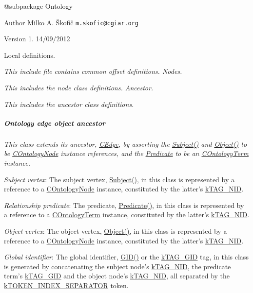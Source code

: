 {\itshape \begin{DoxyVerb} @subpackage        Ontology
\end{DoxyVerb}
}

{\itshape \begin{DoxyAuthor}{Author}
Milko A. Škofič \href{mailto:m.skofic@cgiar.org}{\tt m.\-skofic@cgiar.\-org} 
\end{DoxyAuthor}
\begin{DoxyVersion}{Version}
1. 14/09/2012
\end{DoxyVersion}
Local definitions.}

{\itshape This include file contains common offset definitions. Nodes.}

{\itshape This includes the node class definitions. Ancestor.}

{\itshape This includes the ancestor class definitions. \subparagraph*{Ontology edge object ancestor}}

{\itshape }

{\itshape This class extends its ancestor, \hyperlink{class_c_edge}{C\-Edge}, by asserting the \hyperlink{}{Subject()} and \hyperlink{}{Object()} to be \hyperlink{class_c_ontology_node}{C\-Ontology\-Node} instance references, and the \hyperlink{}{Predicate} to be an \hyperlink{class_c_ontology_term}{C\-Ontology\-Term} instance.}

{\itshape 
\begin{DoxyItemize}
\item {\itshape Subject vertex}\-: The subject vertex, {\ttfamily \hyperlink{}{Subject()}}, in this class is represented by a reference to a \hyperlink{class_c_ontology_node}{C\-Ontology\-Node} instance, constituted by the latter's \hyperlink{}{k\-T\-A\-G\-\_\-\-N\-I\-D}. 
\item {\itshape Relationship predicate}\-: The predicate, {\ttfamily \hyperlink{}{Predicate()}}, in this class is represented by a reference to a \hyperlink{class_c_ontology_term}{C\-Ontology\-Term} instance, constituted by the latter's \hyperlink{}{k\-T\-A\-G\-\_\-\-N\-I\-D}. 
\item {\itshape Object vertex}\-: The object vertex, {\ttfamily \hyperlink{}{Object()}}, in this class is represented by a reference to a \hyperlink{class_c_ontology_node}{C\-Ontology\-Node} instance, constituted by the latter's \hyperlink{}{k\-T\-A\-G\-\_\-\-N\-I\-D}. 
\item {\itshape Global identifier}\-: The global identifier, {\ttfamily \hyperlink{}{G\-I\-D()}} or the {\ttfamily \hyperlink{}{k\-T\-A\-G\-\_\-\-G\-I\-D}} tag, in this class is generated by concatenating the subject node's \hyperlink{}{k\-T\-A\-G\-\_\-\-N\-I\-D}, the predicate term's \hyperlink{}{k\-T\-A\-G\-\_\-\-G\-I\-D} and the object node's \hyperlink{}{k\-T\-A\-G\-\_\-\-N\-I\-D}, all separated by the \hyperlink{}{k\-T\-O\-K\-E\-N\-\_\-\-I\-N\-D\-E\-X\-\_\-\-S\-E\-P\-A\-R\-A\-T\-O\-R} token. 
\end{DoxyItemize}}

